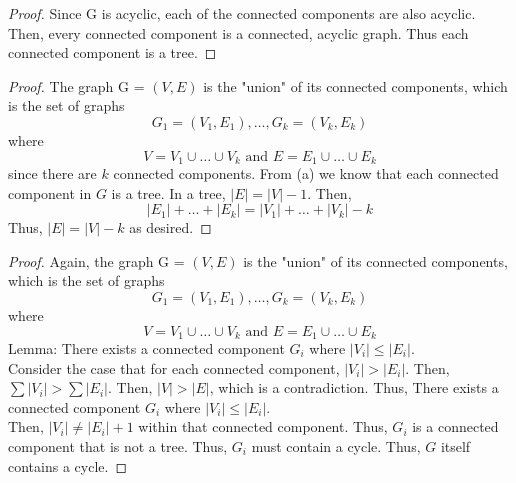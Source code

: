 \documentclass[11pt]{article}
\begin{document}
\begin{solution}
\begin{Parts}
\Part \begin{proof} 
 Since G is acyclic, each of the connected components are also acyclic.
 Then, every connected component is a connected, acyclic graph.
 Thus each connected component is a tree.
\end{proof}

\Part \begin{proof} 
The graph G = $(V,E)$ is the "union" of its connected components, which is the set of graphs
$$G_1=(V_1,E_1),\dots,G_k=(V_k,E_k)$$
where $$V=V_1\cup\dots\cup V_k\text{ and }E=E_1\cup\dots\cup E_k$$
since there are $k$ connected components. 
From (a) we know that each connected component in $G$ is a tree.
In a tree, $|E|=|V|-1$.
Then,
$$|E_1|+\dots+|E_k|=|V_1|+\dots+|V_k|-k$$
Thus, $|E|=|V|-k$ as desired.
\end{proof}

\Part 
\begin{proof} 
Again, the graph G = $(V,E)$ is the "union" of its connected components, which is the set of graphs
$$G_1=(V_1,E_1),\dots,G_k=(V_k,E_k)$$
where $$V=V_1\cup\dots\cup V_k\text{ and }E=E_1\cup\dots\cup E_k$$
Lemma: There exists a connected component $G_i$ where $|V_i|\leq|E_i|$.
\\Consider the case that for each connected component, $|V_i|>|E_i|$. 
Then, $\sum|V_i|>\sum|E_i|$. 
Then, $|V|>|E|$, which is a contradiction.
Thus, There exists a connected component $G_i$ where $|V_i|\leq|E_i|$.
\\Then, $|V_i|\neq|E_i|+1$ within that connected component. 
Thus, $G_i$ is a connected component that is not a tree.
Thus, $G_i$ must contain a cycle. Thus, $G$ itself contains a cycle.
\end{proof}
\end{Parts}
\end{solution} \newpage

\end{document}
